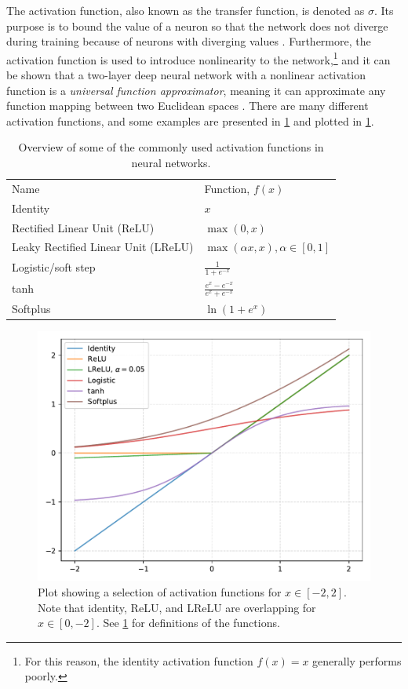 The activation function, also known as the transfer function, is denoted as $\sigma$. Its purpose is to bound the value of a neuron so that the network does not diverge during training because of neurons with diverging values \cite[81]{Wang2003}. Furthermore, the activation function is used to introduce nonlinearity to the network,\footnote{For this reason, the identity activation function $f(x)=x$ generally performs poorly.} and it can be shown that a two-layer deep neural network with a nonlinear activation function is a \textit{universal function approximator}, meaning it can approximate any function mapping between two Euclidean spaces \cite{Cybenko1989}. There are many different activation functions, and some examples are presented in \cref{tab:activationfunctions} and plotted in \cref{fig:activationfunctions}.

\begin{table}[htbp]
    \centering
    \caption[Activation functions for neural networks]{Overview of some of the commonly used activation functions in neural networks. }
    \label{tab:activationfunctions}
    \begin{tabular}{ll}
    \hline
    Name & Function, $f(x)$ \\
    \hhline{==}
    Identity & $x$ \\
    Rectified Linear Unit (ReLU) & $\max\left(0, x\right)$ \\
    Leaky Rectified Linear Unit (LReLU) & $\max\left(\alpha x, x\right), \alpha\in[0,1]$ \\
    Logistic/soft step & $\frac{1}{1+e^{-x}}$  \\
    tanh & $\frac{e^x - e^{-x}}{e^x + e^{-x}}$ \\
    Softplus & $\ln\left(1+e^x\right)$ \\
    \hline
    \end{tabular}
\end{table}

\begin{figure}[htbp]  
    \centering
    \includegraphics[width=.8\textwidth]{figures/activationfunctions.pdf}
    \caption[Activation functions for neural networks]{Plot showing a selection of activation functions for $x\in[-2,2]$. Note that identity, ReLU, and LReLU are overlapping for $x\in[0,-2]$. See \cref{tab:activationfunctions} for definitions of the functions. }
    \label{fig:activationfunctions}
\end{figure}

